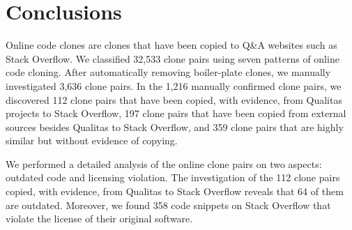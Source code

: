 \documentclass[10pt,journal,compsoc]{IEEEtran}
\begin{document}
%

\section{Conclusions}

Online code clones are clones that have been copied to Q\&A websites
such as Stack Overflow. 
We classified 32,533 clone pairs using seven patterns of online code
cloning.  After automatically removing boiler-plate clones, we
manually investigated 3,636 clone pairs. In the 1,216 manually
confirmed clone pairs, we discovered 112 clone pairs that have been
copied, with evidence, from Qualitas projects to Stack Overflow, 197
clone pairs that have been copied from external sources besides
Qualitas to Stack Overflow, and 359 clone pairs that are highly
similar but without evidence of copying.

We performed a detailed analysis of the online clone pairs on two
aspects: outdated code and licensing violation. The investigation of
the 112 clone pairs copied, with evidence, from Qualitas to Stack
Overflow reveals that 64 of them are outdated.  Moreover, we found 358
code snippets on Stack Overflow that violate the license of their
original software.
\end{document}
